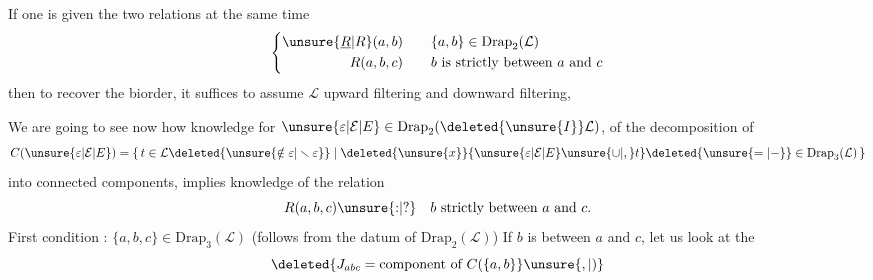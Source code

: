 If one is given the two relations at the same time
\[
\left\{\begin{aligned}
\unsure{\underline R|R}(a,b)&\qquad \{a,b\}\in\mathrm{Drap}_2(\mathcal L)\\
R(a,b,c)&\qquad b\text{ is strictly between }a\text{ and }c
\end{aligned}\right.
\]
then to recover the biorder, it suffices to assume $\mathcal L$ upward filtering and downward filtering,  

 We are going to see now how knowledge for $\unsure{\varepsilon|\mathcal E|E}\in\mathrm{Drap}_2(\deleted{\unsure{I}}\mathcal L)$, of the decomposition of
\[
 C(\unsure{\varepsilon|\mathcal E|E})=\{\,t\in\mathcal L\deleted{\unsure{\notin\varepsilon|\smallsetminus\varepsilon}}\mid
 \deleted{\unsure{x}}\{\unsure{\varepsilon|\mathcal E|E}\unsure{\cup|,}t\}\deleted{\unsure{=|-}}\in\mathrm{Drap}_3(\mathcal L)\,\}
\]
into connected components, implies knowledge of the relation
\[
 R(a,b,c)\unsure{\mathord{:}|\mathord{?}}\quad b\text{ strictly between }a\text{ and }c.
\]
First condition : $\{a,b,c\}\in\mathrm{Drap}_3(\mathcal L)$ (follows from the datum of $\mathrm{Drap}_2(\mathcal L)$)
If $b$ is between $a$ and $c$, let us look at the
\[
 \deleted{J_{abc}=\text{component of }C(\{a,b\}}\unsure{,|)}
\]

